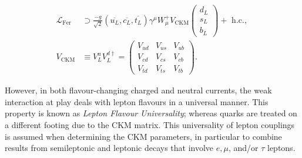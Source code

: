 \begin{equation}
	\begin{aligned}
		\mathcal{L}_{\mathrm{Fer}} &\supset
		\frac{-g}{\sqrt{2}}
		\left(\overline{u_{L}}, \overline{c_{L}}, \overline{t_{L}}\right) 
		\gamma^{\mu} W_{\mu}^{+} V_{\mathrm{CKM}}\left(
			\begin{array}{l}
				d_{L} \\
				s_{L} \\
				b_{L}
			\end{array}
		\right)+\text { h.c., } 
		\\V_{\mathrm{CKM}} &\equiv V_{L}^{u} V_{L}^{d \dagger}
		=\left(\begin{array}{ccc}
			V_{u d} & V_{u s} & V_{u b} \\
			V_{c d} & V_{c s} & V_{c b} \\
			V_{t d} & V_{t s} & V_{t b}
		\end{array}\right) .
	\end{aligned}
\end{equation}

However, in both flavour-changing charged and neutral currents, the weak interaction at play deals with lepton flavours in a universal manner. This property is known as \textit{Lepton Flavour Universality}; whereas quarks are treated on a different footing due to the CKM matrix. This universality of lepton couplings is assumed when determining the CKM parameters, in particular to combine results from semileptonic and leptonic decays that involve $e, \mu$, and/or $\tau$ leptons. 

